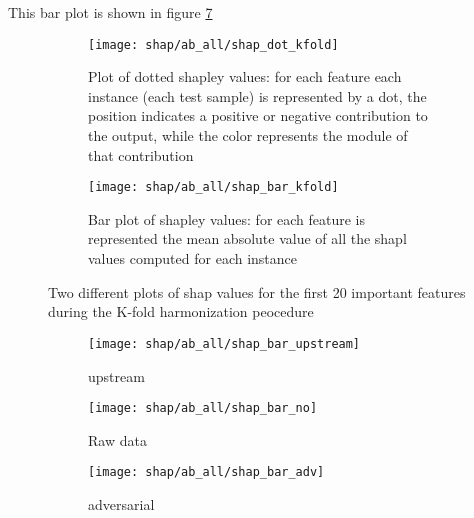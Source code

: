 \documentclass[a4paper,11pt]{article}
\begin{document}
This bar plot is shown in figure \ref{fig:shap_abide_all}

\begin{figure}
\centering
\begin{subfigure}[b]{.45\textwidth}
   \texttt{[image: shap/ab\_all/shap\_dot\_kfold]}
   \caption{Plot of dotted shapley values: for each feature each instance (each test sample) is represented by a dot, the position indicates a positive or negative contribution to the output, while the color represents the module of that contribution}
   \label{}
\end{subfigure}
\begin{subfigure}[b]{.45\textwidth}
   \texttt{[image: shap/ab\_all/shap\_bar\_kfold]}
   \caption{Bar plot of shapley values: for each feature is represented the mean absolute value of all the shapl values computed for each instance}
   \label{}
\end{subfigure}
\caption{Two different plots of shap values for the first 20 important features during the K-fold harmonization peocedure}
\label{fig:shap_features_kfold_both}
\end{figure}





\begin{figure}
\centering
\begin{subfigure}[b]{.45\textwidth}
   \texttt{[image: shap/ab\_all/shap\_bar\_upstream]}
   \caption{upstream}
   \label{}
\end{subfigure}
\begin{subfigure}[b]{.45\textwidth}
   \texttt{[image: shap/ab\_all/shap\_bar\_no]}
   \caption{Raw data}
   \label{}
\end{subfigure}
\begin{subfigure}[b]{.45\textwidth}
   \texttt{[image: shap/ab\_all/shap\_bar\_adv]}
   \caption{adversarial}
   \label{}
\end{subfigure}
\caption{}
\label{fig:shap_abide_all}
\end{figure}
\end{document}
